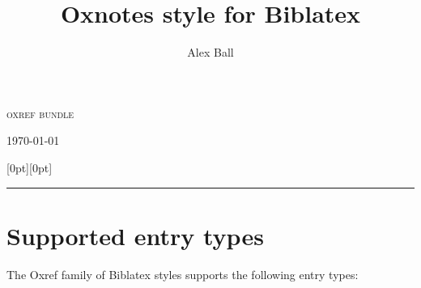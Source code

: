 \documentclass[extrafontsizes,11pt,a4paper,oneside]{memoir}
\title{Oxnotes style for Biblatex}
\author{Alex Ball}
\begin{document}
    \thispagestyle{empty}
    \begin{adjustwidth}{.2\textwidth}{0pt}
        \sffamily\setlength{\parindent}{0pt}%
        \LARGE\textsc{oxref bundle}
        
        \LARGE\thetitle
        
        \bigskip
        \Large\theauthor
        
        \bigskip
        \Large\ifx\undefined\thedate\today\else\thedate\fi
    \end{adjustwidth}
    
    \noindent
    \hspace*{.1\textwidth}\raisebox{0pt}[0pt][0pt]{\rule{\normalrulethickness}{\textheight}}
    
    \newpage
    \tableofcontents*
    
    \chapter{Supported entry types}
    
    The Oxref family of Biblatex styles supports the following entry types:
    
\end{document}
